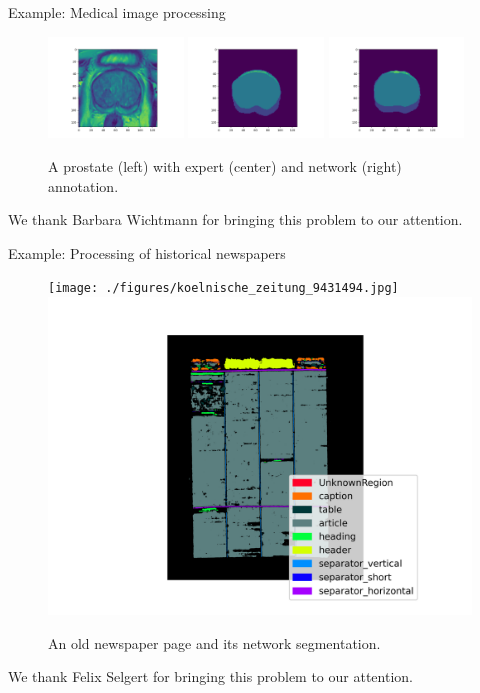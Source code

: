 \documentclass{beamer}
\begin{document}
    \begin{frame}{Example: Medical image processing}
      \begin{figure}
        \includegraphics[width=0.32\textwidth]{./figures/prostatext2.png}
        \includegraphics[width=0.32\textwidth]{./figures/prostatext2_true.png}
        \includegraphics[width=0.32\textwidth]{./figures/prostatext2_net.png}
      \caption{A prostate (left) with expert (center) and network (right) annotation.}
      \end{figure}

      We thank Barbara Wichtmann for bringing this problem to our attention.
    \end{frame}

    \begin{frame}{Example: Processing of historical newspapers}
      \begin{figure}
        \texttt{[image: ./figures/koelnische\_zeitung\_9431494.jpg]}
        \includegraphics[scale=0.36]{./figures/segmentation_9431494.png}
      \caption{An old newspaper page and its network segmentation.}
      \end{figure}
      We thank Felix Selgert for bringing this problem to our attention.
    \end{frame}
\end{document}
